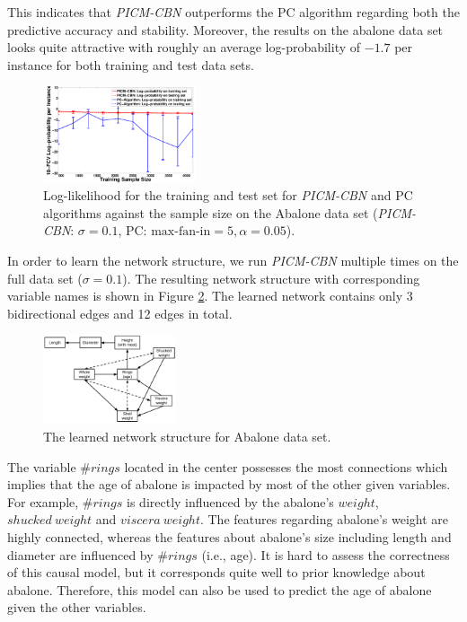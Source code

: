 \documentclass{article}
\begin{document}
This indicates that \textit{PICM-CBN} outperforms the PC algorithm regarding both the predictive accuracy and stability. Moreover, the results on the abalone data set looks quite attractive with roughly an average log-probability of $-1.7$ per instance for both training and test data sets.
\begin{figure}[H]
\centering
\includegraphics[width=0.4\textwidth]{Figures/plotsall/AbaloneSizeTrainTestLogPcCpl2}
\caption{Log-likelihood for the training and test set for \textit{PICM-CBN} and PC algorithms against 
	    the sample size on the Abalone data set (\textit{PICM-CBN}: $\sigma = 0.1$, PC: $\text{max-fan-in}=5, \alpha=0.05$).}
\label{fig:abalonelp}
\end{figure} 
In order to learn the network structure, we run \textit{PICM-CBN} multiple times on the full data set 
($\sigma=0.1$). The resulting %
network structure with corresponding variable names is shown in %
Figure \ref{fig:abaloneNetwork}. The learned network contains only 3 bidirectional edges and 12 edges 
in total. %
\begin{figure} %
\centering
\includegraphics[width=0.35\textwidth]{Figures/AbaloneNetwork}
\caption{The learned network structure for Abalone data set.}
\label{fig:abaloneNetwork}
\vspace{-0.1in}
\end{figure}
The variable $\#rings$ located in the center possesses the most connections which 
implies that the age of abalone is impacted by most of the other given variables. For example, $\#rings$ is directly
 influenced by the abalone's $weight$, $shucked~weight$ and $viscera~weight$. The features regarding abalone's
 weight are highly connected, whereas the features about abalone's size including length and diameter are influenced
 by $\#rings$ (i.e., age). It is hard to assess the correctness of this causal model, but it corresponds
quite well to  prior knowledge about abalone.
Therefore, this model can also be used to predict the age of abalone given the other variables.
%
\end{document}
